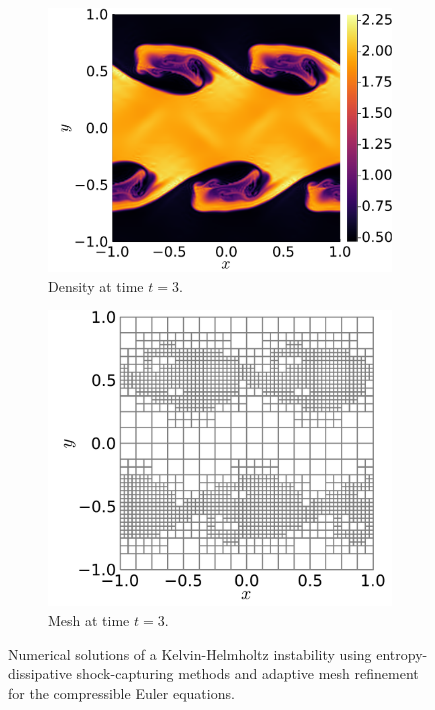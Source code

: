 \documentclass{juliacon}
\begin{document}
\begin{figure}[htbp]
  \\
  \begin{subfigure}{0.53\linewidth}
    \includegraphics[width=\textwidth]{../figures/kelvin_helmholtz_density_t3}
    \caption{Density at time $t = 3$.}
  \end{subfigure}%
  \hspace*{\fill}
  \begin{subfigure}{0.47\linewidth}
    \includegraphics[width=\textwidth]{../figures/kelvin_helmholtz_mesh_t3}
    \caption{Mesh at time $t = 3$.}
  \end{subfigure}%
  \caption{Numerical solutions of a Kelvin-Helmholtz instability using
           entropy-dissipative shock-capturing methods and adaptive mesh
           refinement for the compressible Euler equations.}
  \label{fig:kelvin_helmholtzs}
\end{figure}
\end{document}
